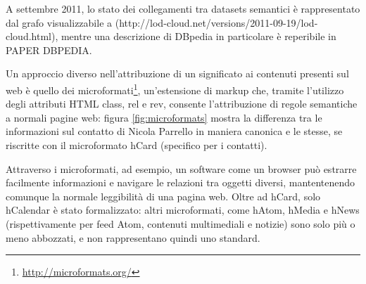 \documentclass[sigproc-sp.tex]{subfiles}
\begin{document}
A settembre 2011, lo stato dei collegamenti tra datasets semantici è rappresentato dal grafo visualizzabile a (http://lod-cloud.net/versions/2011-09-19/lod-cloud.html), mentre una descrizione di DBpedia in particolare è reperibile in PAPER DBPEDIA.

Un approccio diverso nell’attribuzione di un significato ai contenuti presenti sul web è quello dei microformati\footnote{\url{http://microformats.org/}}, un’estensione di markup che, tramite l’utilizzo degli attributi HTML class, rel e rev, consente l’attribuzione di regole semantiche a normali pagine web: figura \ref{fig:microformats} mostra la differenza tra le informazioni sul contatto di Nicola Parrello in maniera canonica e le stesse, se 
riscritte con il microformato hCard (specifico per i contatti).

Attraverso i microformati, ad esempio, un software come un browser può estrarre facilmente informazioni e navigare le relazioni tra oggetti diversi, mantentenendo comunque la normale leggibilità di una pagina web. Oltre ad hCard, solo hCalendar è stato formalizzato: altri microformati, come hAtom, hMedia e hNews (rispettivamente per feed Atom, contenuti multimediali e notizie) sono solo più o meno abbozzati, e non rappresentano quindi uno standard.
\end{document}
